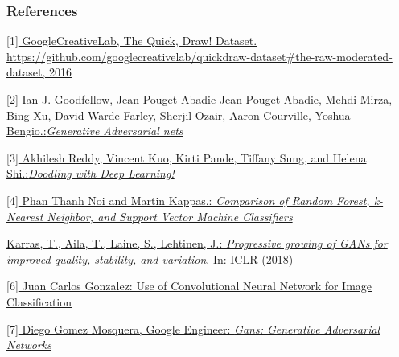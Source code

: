 \documentclass{article} %
\begin{document}
\pagebreak
\subsubsection*{References}

\small{
\smallskip

[1]\href{https://github.com/googlecreativelab/quickdraw-dataset#the-raw-moderated-dataset, 2016}{ GoogleCreativeLab, The Quick, Draw! Dataset. https://github.com/googlecreativelab/quickdraw-dataset#the-raw-moderated-dataset, 2016}
\smallskip

[2]\href{https://arxiv.org/abs /1406.2661} { Ian J. Goodfellow, Jean Pouget-Abadie  Jean Pouget-Abadie, Mehdi Mirza, Bing Xu, David Warde-Farley, Sherjil Ozair, Aaron Courville, Yoshua Bengio.:{\it Generative Adversarial nets}}
\smallskip

[3]\href{https://github.com/QuickDraw-sketchRecognition/Sketch_Recognition/}{ Akhilesh Reddy, Vincent Kuo, Kirti Pande, Tiffany Sung, and Helena Shi.:{\it Doodling with Deep Learning!}} 

\smallskip

[4]\href{https://www.ncbi.nlm.nih.gov/pmc/articles/PMC5796274/} { Phan Thanh Noi and Martin Kappas.: {\it Comparison of Random Forest, k-Nearest Neighbor, and Support Vector Machine Classifiers} }

\smallskip
[5]\href{https://arxiv.org/pdf/1710.10196.pdf}{ Karras, T., Aila, T., Laine, S., Lehtinen, J.: {\it Progressive growing of GANs for improved quality, stability, and variation}. In: ICLR (2018)}
\smallskip

[6]\href{https://www.apsl.net/blog/2017/11/20/use-convolutional-neural-network-image-classification/}{ Juan Carlos Gonzalez: Use of Convolutional Neural Network for Image Classification}
\smallskip

[7]\href{https://github.com/diegoalejogm/gans}{ Diego Gomez Mosquera, Google Engineer: {\it Gans: Generative Adversarial Networks} }
}
\end{document}
